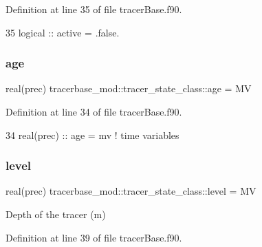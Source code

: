 Definition at line 35 of file tracer\+Base.\+f90.


\begin{DoxyCode}
35         \textcolor{keywordtype}{logical} :: active = .false.             
\end{DoxyCode}
\mbox{\label{structtracerbase__mod_1_1tracer__state__class_aabf14569a79276d6cdd0f0a537cfb046}} 
\subsubsection{\texorpdfstring{age}{age}}
{\footnotesize\ttfamily real(prec) tracerbase\+\_\+mod\+::tracer\+\_\+state\+\_\+class\+::age = MV\hspace{0.3cm}{\ttfamily [private]}}



Definition at line 34 of file tracer\+Base.\+f90.


\begin{DoxyCode}
34         \textcolor{keywordtype}{real(prec)} :: age = mv             \textcolor{comment}{! time variables}
\end{DoxyCode}
\mbox{\label{structtracerbase__mod_1_1tracer__state__class_aab144782751a09c5798e03e5eb4133d7}} 
\subsubsection{\texorpdfstring{level}{level}}
{\footnotesize\ttfamily real(prec) tracerbase\+\_\+mod\+::tracer\+\_\+state\+\_\+class\+::level = MV\hspace{0.3cm}{\ttfamily [private]}}



Depth of the tracer (m) 



Definition at line 39 of file tracer\+Base.\+f90.


